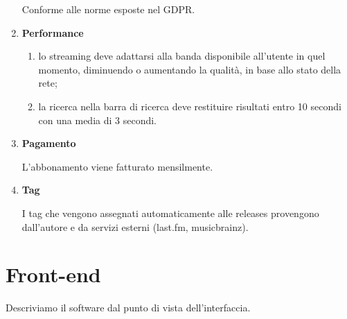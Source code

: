 \documentclass[a4paper,12pt]{article}
\begin{document}
\begin{enumerate}[label=\textbf{RNF\arabic*}\;, ref=\textbf{RNF\arabic*}]
    Conforme alle norme esposte nel GDPR.
    \item \label{itm:rnf6} \textbf{Performance}
    
    \begin{enumerate}[label=\textbf{\alph*}, ref=\textbf{RNF6\alph*}, itemsep=0.5em]
        \item \label{itm:rnf6a} lo streaming deve adattarsi alla banda disponibile all’utente in quel momento, diminuendo o aumentando la qualità, in base allo stato della rete;
        \item \label{itm:rnf6b} la ricerca nella barra di ricerca deve restituire risultati entro 10 secondi con una media di 3 secondi.
    \end{enumerate}

    \item \label{itm:rnf7} \textbf{Pagamento}
    
    L’abbonamento viene fatturato mensilmente.
    \item \label{itm:rnf8} \textbf{Tag}
    
    I tag che vengono assegnati automaticamente alle releases provengono dall’autore e da servizi esterni (last.fm, musicbrainz).
\end{enumerate}

\section{Front-end}

Descriviamo il software dal punto di vista dell'interfaccia.
\end{document}

